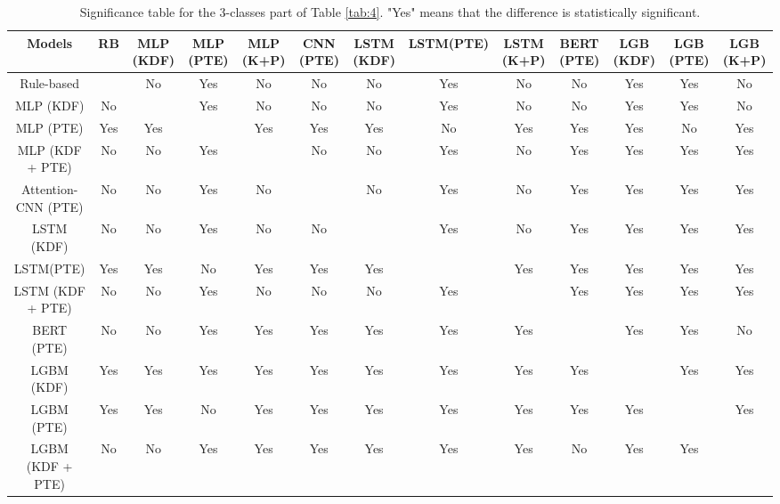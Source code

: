 \documentclass[11pt]{article}
\begin{document}
\begin{table}[t]
  \tabcolsep=0.05cm
  \tiny
  \centering
  \begin{tabular}{c|cccccccccccc} \toprule 
    Models & RB & MLP (KDF) & MLP (PTE) & MLP (K+P) & CNN (PTE) & LSTM (KDF) & LSTM(PTE) & LSTM (K+P) & BERT (PTE) & LGB (KDF) & LGB (PTE) & LGB (K+P) \\ \midrule 
    Rule-based & & No & Yes & No & No & No & Yes & No & No & Yes & Yes & No \\ 
    MLP (KDF) & No & & Yes & No & No & No & Yes & No & No & Yes & Yes & No \\ 
    MLP (PTE) & Yes & Yes & & Yes & Yes & Yes & No & Yes & Yes & Yes & No & Yes \\
    MLP (KDF + PTE) & No & No & Yes & & No & No & Yes & No & Yes & Yes & Yes & Yes \\
    Attention-CNN (PTE) & No & No & Yes & No & & No & Yes & No & Yes & Yes & Yes & Yes \\
    LSTM (KDF) & No & No & Yes & No & No & & Yes & No & Yes & Yes & Yes & Yes \\
    LSTM(PTE) & Yes & Yes & No & Yes & Yes & Yes & & Yes & Yes & Yes & Yes & Yes \\
    LSTM (KDF + PTE) & No & No & Yes & No & No & No & Yes & & Yes & Yes & Yes & Yes \\
    BERT (PTE) & No & No & Yes & Yes & Yes & Yes & Yes & Yes & & Yes & Yes & No \\
    LGBM (KDF) & Yes & Yes & Yes & Yes & Yes & Yes & Yes & Yes & Yes & & Yes & Yes \\
    LGBM (PTE) & Yes & Yes & No & Yes & Yes & Yes & Yes & Yes & Yes & Yes & & Yes \\
    LGBM (KDF + PTE) & No & No & Yes & Yes & Yes & Yes & Yes & Yes & No & Yes & Yes & \\ \bottomrule
  \end{tabular}
  \caption{Significance table for the 3-classes part of Table \ref{tab:4}. "Yes" means that the difference is statistically significant.}
  \label{tab:8}
\end{table}
    
\end{document}
